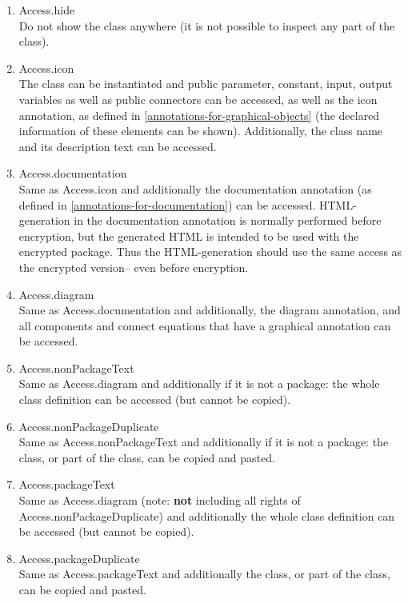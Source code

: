 \documentclass[10pt,a4paper]{report}
\renewcommand{\labelenumi}{\arabic{enumi}.}
\begin{document}
\begin{enumerate}
\def\labelenumi{\arabic{enumi}.}
\item
  Access.hide\\
  Do not show the class anywhere (it is not possible to inspect any part
  of the class).
\item
  Access.icon\textbf{\\
  }The class can be instantiated and public parameter, constant, input,
  output variables as well as public connectors can be accessed, as well
  as the icon annotation, as defined in \ref{annotations-for-graphical-objects} (the declared
  information of these elements can be shown). Additionally, the class
  name and its description text can be accessed.
\item
  Access.documentation\\
  Same as Access.icon and additionally the documentation annotation (as
  defined in \ref{annotations-for-documentation}) can be accessed. HTML-generation in the
  documentation annotation is normally performed before encryption, but
  the generated HTML is intended to be used with the encrypted package.
  Thus the HTML-generation should use the same access as the encrypted
  version-- even before encryption.
\item
  Access.diagram\\
  Same as Access.documentation and additionally, the diagram annotation,
  and all components and connect equations that have a graphical
  annotation can be accessed.
\item
  Access.nonPackageText\\
  Same as Access.diagram and additionally if it is not a package: the
  whole class definition can be accessed (but cannot be copied).
\item
  Access.nonPackageDuplicate\\
  Same as Access.nonPackageText and additionally if it is not a package:
  the class, or part of the class, can be copied and pasted.
\item
  Access.packageText\\
  Same as Access.diagram (note: \textbf{not} including all rights of
  Access.nonPackageDuplicate) and additionally the whole class
  definition can be accessed (but cannot be copied).
\item
  Access.packageDuplicate\\
  Same as Access.packageText and additionally the class, or part of the
  class, can be copied and pasted.
\end{enumerate}
\end{document}
